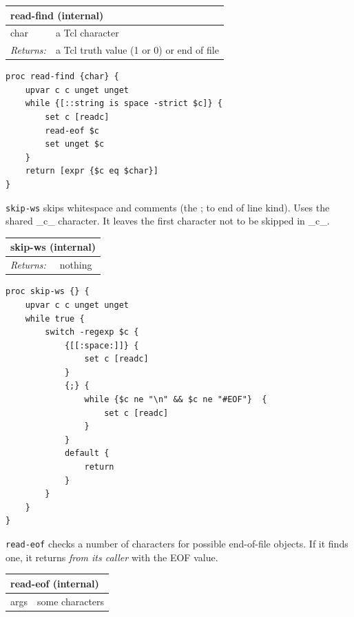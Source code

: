 \documentclass[twoside,9pt]{report}
\begin{document}
\begin{tabular}{ |l l| }
\hline
\multicolumn{2}{|l|}{read-find (internal)} \\
\hline
char & a Tcl character \\
\textit{Returns:} & a Tcl truth value (1 or 0) or end of file \\
\hline
\end{tabular}

\noindent\makebox[\linewidth]{\rule{\linewidth}{0.4pt}}
\begin{lstlisting}
proc read-find {char} {
    upvar c c unget unget
    while {[::string is space -strict $c]} {
        set c [readc]
        read-eof $c
        set unget $c
    }
    return [expr {$c eq $char}]
}
\end{lstlisting}
\noindent\makebox[\linewidth]{\rule{\linewidth}{0.4pt}}

\texttt{skip-ws} skips whitespace and comments (the ; to end of line kind). Uses the shared \_c\_ character. It leaves the first character not to be skipped in \_c\_.

\begin{tabular}{ |l l| }
\hline
\multicolumn{2}{|l|}{skip-ws (internal)} \\
\hline
\textit{Returns:} & nothing \\
\hline
\end{tabular}

\noindent\makebox[\linewidth]{\rule{\linewidth}{0.4pt}}
\begin{lstlisting}
proc skip-ws {} {
    upvar c c unget unget
    while true {
        switch -regexp $c {
            {[[:space:]]} {
                set c [readc]
            }
            {;} {
                while {$c ne "\n" && $c ne "#EOF"}  {
                    set c [readc]
                }
            }
            default {
                return
            }
        }
    }
}
\end{lstlisting}
\noindent\makebox[\linewidth]{\rule{\linewidth}{0.4pt}}

\texttt{read-eof} checks a number of characters for possible end-of-file objects. If it finds one, it returns \emph{from its caller} with the EOF value.

\begin{tabular}{ |l l| }
\hline
\multicolumn{2}{|l|}{read-eof (internal)} \\
\hline
args & some characters \\
\hline
\end{tabular}
\end{document}
